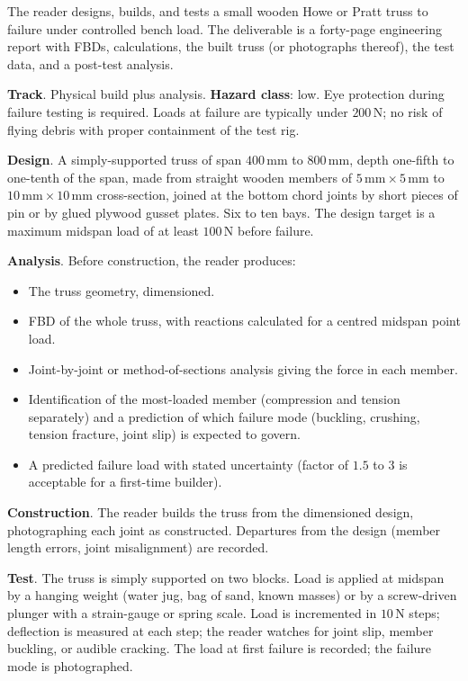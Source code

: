 \begin{project}
The reader designs, builds, and tests a small wooden Howe or Pratt
truss to failure under controlled bench load. The deliverable is a
forty-page engineering report with FBDs, calculations, the built
truss (or photographs thereof), the test data, and a post-test
analysis.

\textbf{Track}. Physical build plus analysis. \textbf{Hazard
class}: low. Eye protection during failure testing is required.
Loads at failure are typically under $200\,\text{N}$; no risk of
flying debris with proper containment of the test rig.

\textbf{Design}. A simply-supported truss of span $400\,\si{
\milli\meter}$ to $800\,\si{\milli\meter}$, depth one-fifth to
one-tenth of the span, made from straight wooden members of
$5\,\si{\milli\meter} \times 5\,\si{\milli\meter}$ to $10\,\si{
\milli\meter} \times 10\,\si{\milli\meter}$ cross-section, joined at
the bottom chord joints by short pieces of pin or by glued plywood
gusset plates. Six to ten bays. The design target is a maximum
midspan load of at least $100\,\si{\newton}$ before failure.

\textbf{Analysis}. Before construction, the reader produces:

\begin{itemize}[leftmargin=*]
  \item The truss geometry, dimensioned.
  \item FBD of the whole truss, with reactions calculated for a
    centred midspan point load.
  \item Joint-by-joint or method-of-sections analysis giving the
    force in each member.
  \item Identification of the most-loaded member (compression and
    tension separately) and a prediction of which failure mode
    (buckling, crushing, tension fracture, joint slip) is expected
    to govern.
  \item A predicted failure load with stated uncertainty (factor of
    $1.5$ to $3$ is acceptable for a first-time builder).
\end{itemize}

\textbf{Construction}. The reader builds the truss from the
dimensioned design, photographing each joint as constructed.
Departures from the design (member length errors, joint
misalignment) are recorded.

\textbf{Test}. The truss is simply supported on two blocks. Load is
applied at midspan by a hanging weight (water jug, bag of sand,
known masses) or by a screw-driven plunger with a strain-gauge or
spring scale. Load is incremented in $10\,\si{\newton}$ steps;
deflection is measured at each step; the reader watches for joint
slip, member buckling, or audible cracking. The load at first
failure is recorded; the failure mode is photographed.


\end{project}
